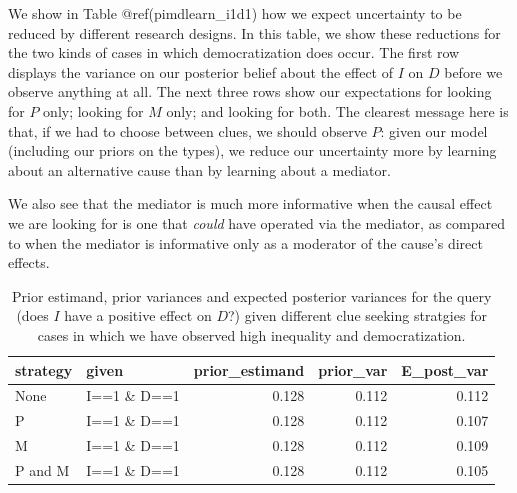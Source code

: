 \documentclass[12pt,]{book}
\begin{document}
We show in Table @ref(pimdlearn\_i1d1) how we expect uncertainty to be reduced by different research designs. In this table, we show these reductions for the two kinds of cases in which democratization does occur. The first row displays the variance on our posterior belief about the effect of \(I\) on \(D\) before we observe anything at all. The next three rows show our expectations for looking for \(P\) only; looking for \(M\) only; and looking for both. The clearest message here is that, if we had to choose between clues, we should observe \(P\): given our model (including our priors on the types), we reduce our uncertainty more by learning about an alternative cause than by learning about a mediator.

We also see that the mediator is much more informative when the causal effect we are looking for is one that \emph{could} have operated via the mediator, as compared to when the mediator is informative only as a moderator of the cause's direct effects.

\begin{table}[t]

\caption{\label{tab:unnamed-chunk-66}\label{pimdlearn_i1d1} Prior estimand, prior variances and expected posterior variances for the query (does $I$ have a positive effect on $D$?) given different clue seeking  stratgies for cases in which we have observed high inequality and democratization.}
\centering
\begin{tabular}{l|l|r|r|r}
\hline
strategy & given & prior\_estimand & prior\_var & E\_post\_var\\
\hline
None & I==1 \& D==1 & 0.128 & 0.112 & 0.112\\
\hline
P & I==1 \& D==1 & 0.128 & 0.112 & 0.107\\
\hline
M & I==1 \& D==1 & 0.128 & 0.112 & 0.109\\
\hline
P and M & I==1 \& D==1 & 0.128 & 0.112 & 0.105\\
\hline
\end{tabular}
\end{table}
\end{document}
